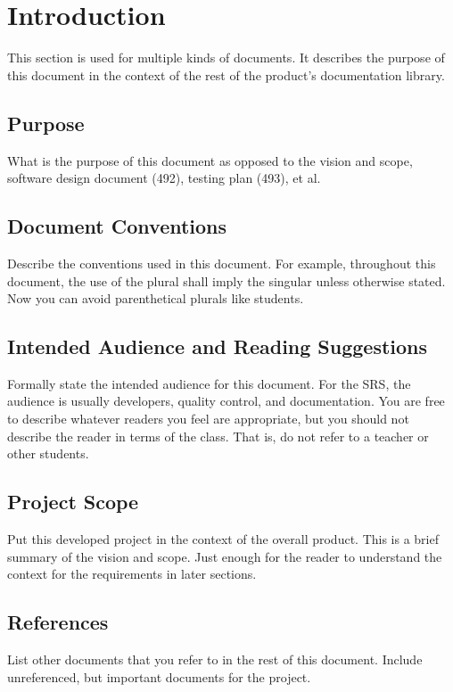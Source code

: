 \section{Introduction}
 This section is used for multiple kinds of documents.  It describes the
 purpose of this document in the context of the rest of the product's
 documentation library.  


\subsection{Purpose}
 What is the purpose of this document as opposed to the vision and scope,
 software design document (492), testing plan (493), et al.

\subsection{Document Conventions}
 Describe the conventions used in this document.  For example, throughout this
 document, the use of the plural shall imply the singular unless otherwise
 stated.  Now you can avoid parenthetical plurals like students.   

\subsection{Intended Audience and Reading Suggestions}
 Formally state the intended audience for this document.  For the SRS, the
 audience is usually developers, quality control, and documentation.  You are
 free to describe whatever readers you feel are appropriate, but you should not
 describe the reader in terms of the class.  That is, do not refer to a teacher
 or other students.  

\subsection{Project Scope}
 Put this developed project in the context of the overall product.  This is a
 brief summary of the vision and scope.  Just enough for the reader to
 understand the context for the requirements in later sections.

\subsection{References}
 List other documents that you refer to in the rest of this document.  Include
 unreferenced, but important documents for the project.  



